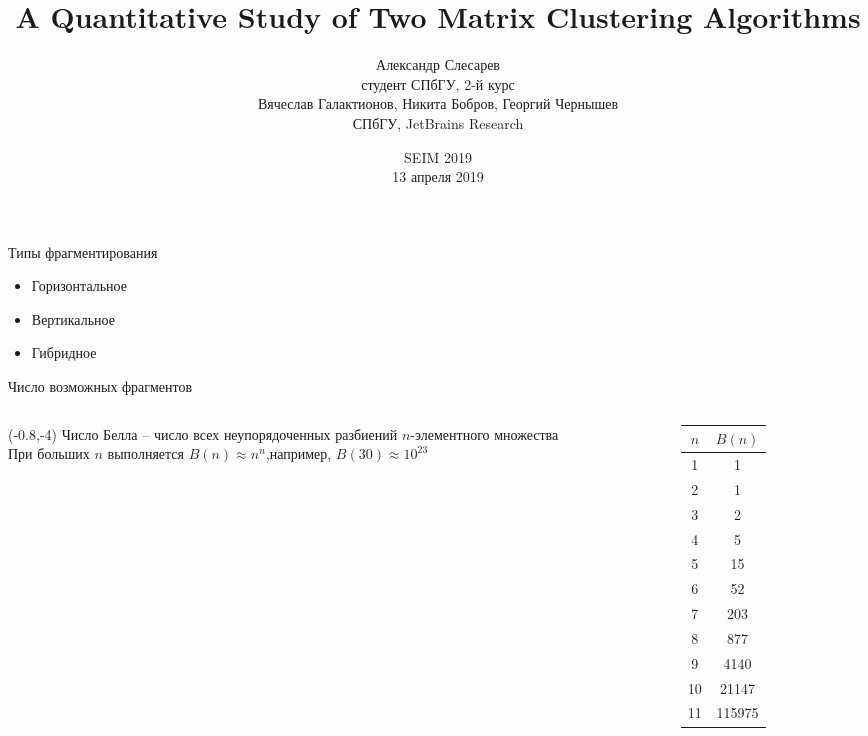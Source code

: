 \documentclass[10pt, dvipsnames]{beamer}
\title{A Quantitative Study of Two Matrix Clustering Algorithms}
\author{{Александр Слесарев}%
		\\
		студент СПбГУ, 2-й курс\\[0.1cm]
		Вячеслав Галактионов,\;%
		Никита Бобров,\;%
		Георгий Чернышев%
		\\
		СПбГУ, JetBrains Research
		}
\date[SEIM 2019]{SEIM 2019\\ 13 апреля 2019}
\begin{document}
\maketitle

\begin{frame}{Типы фрагментирования}
	\begin{itemize}
	\item Горизонтальное\\[0.4cm]
	\item Вертикальное\\[0.4cm]
	\item Гибридное\\[0.4cm]
	\end{itemize}
\end{frame}

\begin{frame}{Число возможных фрагментов}
	\begin{columns}
		\begin{column}{0.5\textwidth}
			\begin{textblock}{10}(-0.8,-4)
Число Белла -- число всех неупорядоченных разбиений $n$-элементного множества 
\\[0.5cm]
При больших $n$ выполняется $B(n) \approx n^{n}$,\newline например, $B(30) \approx 10^{23}$
			\end{textblock}
		\end{column}
		\begin{column}{0.2\textwidth}
			\begin{tabular}{|c|c|}
				\hline
				$n$ & $B(n)$\\ \hline
				1   & 1     \\ \hline
				2   & 1     \\ \hline
				3   & 2     \\ \hline
				4   & 5     \\ \hline
				5   & 15    \\ \hline
				6   & 52    \\ \hline
				7   & 203   \\ \hline
				8   & 877   \\ \hline
				9   & 4140  \\ \hline
			   10   & 21147 \\ \hline
			   11  & 115975 \\ \hline
			\end{tabular}
		\end{column}
	\end{columns}	
\end{frame}
\end{document}
